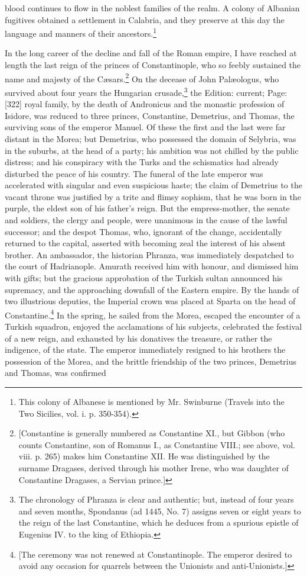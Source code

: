 blood continues to flow in the noblest families of the realm. A colony of Albanian fugitives obtained a settlement in Calabria, and they preserve at this day the language and manners of their ancestors.\footnote{This colony of Albanese is mentioned by Mr. Swinburne (Travels into the Two Sicilies, vol. i. p. 350-354).}

In the long career of the decline and fall of the Roman empire, I have reached at length the last reign of the princes of Constantinople, who so feebly sustained the name and majesty of the Cæsars.\footnote{[Constantine is generally numbered as Constantine XI., but Gibbon (who counts Constantine, son of Romanus I., as Constantine VIII.; see above, vol. viii. p. 265) makes him Constantine XII. He was distinguished by the surname Dragases, derived through his mother Irene, who was daughter of Constantine Dragases, a Servian prince.]} On the decease of John Palæologus, who survived about four years the Hungarian crusade,\footnote{The chronology of Phranza is clear and authentic; but, instead of four years and seven months, Spondanus (ad 1445, No. 7) assigns seven or eight years to the reign of the last Constantine, which he deduces from a spurious epistle of Eugenius IV. to the king of Ethiopia.} the Edition: current; Page: [322] royal family, by the death of Andronicus and the monastic profession of Isidore, was reduced to three princes, Constantine, Demetrius, and Thomas, the surviving sons of the emperor Manuel. Of these the first and the last were far distant in the Morea; but Demetrius, who possessed the domain of Selybria, was in the suburbs, at the head of a party; his ambition was not chilled by the public distress; and his conspiracy with the Turks and the schismatics had already disturbed the peace of his country. The funeral of the late emperor was accelerated with singular and even suspicious haste; the claim of Demetrius to the vacant throne was justified by a trite and flimsy sophism, that he was born in the purple, the eldest son of his father\texthebrew{}’s reign. But the empress-mother, the senate and soldiers, the clergy and people, were unanimous in the cause of the lawful successor; and the despot Thomas, who, ignorant of the change, accidentally returned to the capital, asserted with becoming zeal the interest of his absent brother. An ambassador, the historian Phranza, was immediately despatched to the court of Hadrianople. Amurath received him with honour, and dismissed him with gifts; but the gracious approbation of the Turkish sultan announced his supremacy, and the approaching downfall of the Eastern empire. By the hands of two illustrious deputies, the Imperial crown was placed at Sparta on the head of Constantine.\footnote{[The ceremony was not renewed at Constantinople. The emperor desired to avoid any occasion for quarrels between the Unionists and anti-Unionists.]} In the spring, he sailed from the Morea, escaped the encounter of a Turkish squadron, enjoyed the acclamations of his subjects, celebrated the festival of a new reign, and exhausted by his donatives the treasure, or rather the indigence, of the state. The emperor immediately resigned to his brothers the possession of the Morea, and the brittle friendship of the two princes, Demetrius and Thomas, was confirmed 